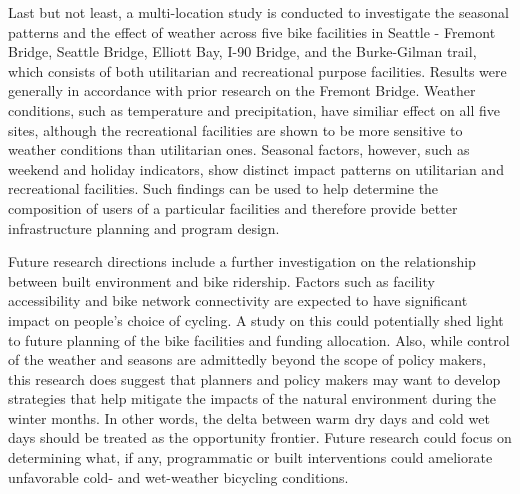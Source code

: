 \documentclass [11pt, proquest] {uwthesis}[2015/03/03]
\begin{document}
Last but not least, a multi-location study is conducted to investigate the seasonal patterns and the effect of weather across five bike facilities in Seattle - Fremont Bridge, Seattle Bridge, Elliott Bay, I-90 Bridge, and the Burke-Gilman trail, which consists of both utilitarian and recreational purpose facilities. Results were generally in accordance with prior research on the Fremont Bridge. Weather conditions, such as temperature and precipitation, have similiar effect on all five sites, although the recreational facilities are shown to be more sensitive to weather conditions than utilitarian ones. Seasonal factors, however, such as weekend and holiday indicators, show distinct impact patterns on utilitarian and recreational facilities. Such findings can be used to help determine the composition of users of a particular facilities and therefore provide better infrastructure planning and program design. 

Future research directions include a further investigation on the relationship between built environment and bike ridership. Factors such as facility accessibility and bike network connectivity are expected to have significant impact on people's choice of cycling. A study on this could potentially shed light to future planning of the bike facilities and funding allocation. Also, while control of the weather and seasons are admittedly beyond the scope of policy makers, this research does suggest that planners and policy makers may want to develop strategies that help mitigate the impacts of the natural environment during the winter months. In other words, the delta between warm dry days and cold wet days should be treated as the opportunity frontier. Future research could focus on determining what, if any, programmatic or built interventions could ameliorate unfavorable cold- and wet-weather bicycling conditions.


%
%



%
%
\appendix
\raggedbottom\sloppy
 
 
\end{document}
